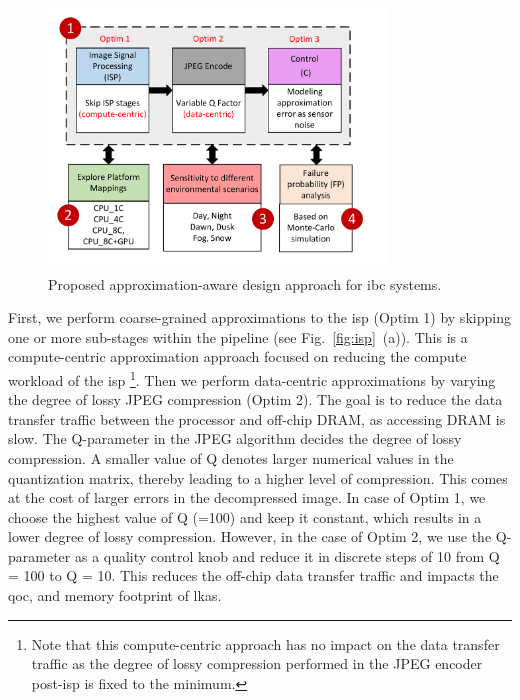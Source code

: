 \begin{figure}[ht]
	\centering
	\includegraphics[width= 0.8\textwidth]{figs/optim1_new_v2.pdf}
	\caption{{Proposed approximation-aware design approach for \gls{ibc} systems.}}
	\label{fig:optim}
\end{figure}
\par First, we perform coarse-grained approximations to the \gls{isp} (Optim 1) by skipping one or more sub-stages within the pipeline (see Fig.~\ref{fig:isp}~(a)). This is a compute-centric approximation approach focused on reducing the compute workload of the \gls{isp} \footnote{Note that this compute-centric approach has no impact on the data transfer traffic as the degree of lossy compression performed in the JPEG encoder post-\gls{isp} is fixed to the minimum.}. Then we perform data-centric approximations by varying the degree of lossy JPEG compression (Optim 2). The goal is to reduce the data transfer traffic between the processor and off-chip DRAM, as accessing DRAM is slow. The Q-parameter in the JPEG algorithm decides the degree of lossy compression. A smaller value of Q denotes larger numerical values in the quantization matrix, thereby leading to a higher level of compression. This comes at the cost of larger errors in the decompressed image. In case of Optim 1, we choose the highest value of Q (=100) and keep it constant, which results in a lower degree of lossy compression. However, in the case of Optim 2, we use the Q-parameter as a quality control knob and reduce it in discrete steps of 10 from Q = 100 to Q = 10. This reduces the off-chip data transfer traffic and impacts the \gls{qoc}, and memory footprint of \gls{lkas}. 

